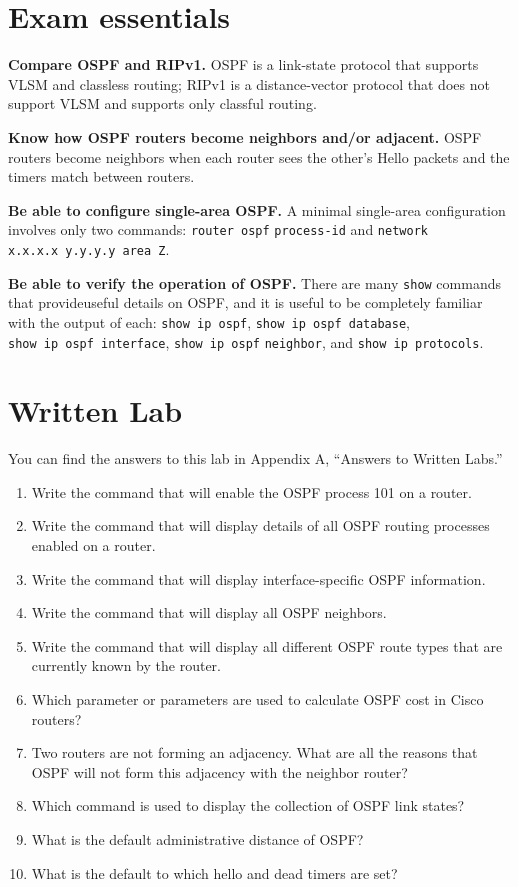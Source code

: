 \section{Exam essentials}

\textbf{Compare OSPF and RIPv1.} OSPF is a link-state protocol that
supports VLSM and classless routing; RIPv1 is a distance-vector protocol
that does not support VLSM and supports only classful routing.

\textbf{Know how OSPF routers become neighbors and/or adjacent.} OSPF
routers become neighbors when each router sees the other's Hello packets
and the timers match between routers.

\protect\hypertarget{c18.xhtmlux5cux23Page_772}{}{}\textbf{Be able to
configure single-area OSPF.} A minimal single-area configuration
involves only two commands: \texttt{router\ ospf} \texttt{process-id}
and \texttt{network} \texttt{x.x.x.x\ y.y.y.y\ area\ Z}.

\textbf{Be able to verify the operation of OSPF.} There are many
\texttt{show} commands that provideuseful details on OSPF, and it is
useful to be completely familiar with the output of each:
\texttt{show\ ip\ ospf}, \texttt{show\ ip\ ospf\ database},
\texttt{show\ ip\ ospf\ interface}, \texttt{show\ ip\ ospf}
\texttt{neighbor}, and \texttt{show\ ip\ protocols}.



\section{Written Lab}

You can find the answers to this lab in Appendix A, ``Answers to Written
Labs.''

\begin{enumerate}
\tightlist
\item
  Write the command that will enable the OSPF process 101 on a router.
\item
  Write the command that will display details of all OSPF routing
  processes enabled on a router.
\item
  Write the command that will display interface-specific OSPF
  information.
\item
  Write the command that will display all OSPF neighbors.
\item
  Write the command that will display all different OSPF route types
  that are currently known by the router.
\item
  Which parameter or parameters are used to calculate OSPF cost in Cisco
  routers?
\item
  Two routers are not forming an adjacency. What are all the reasons
  that OSPF will not form this adjacency with the neighbor router?
\item
  Which command is used to display the collection of OSPF link states?
\item
  What is the default administrative distance of OSPF?
\item
  What is the default to which hello and dead timers are set?
\end{enumerate}



